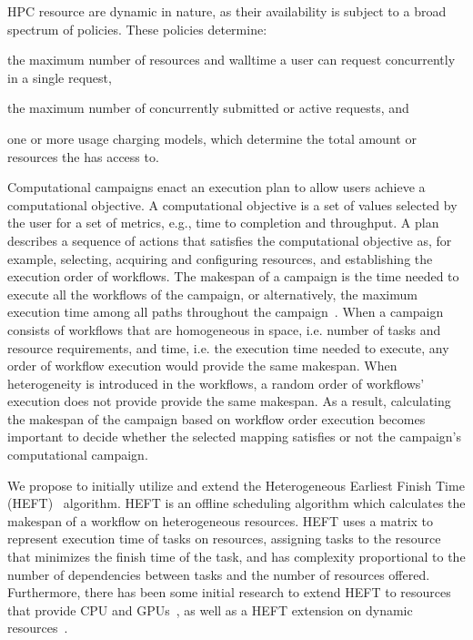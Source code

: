 HPC resource are dynamic in nature, as their availability is subject to a broad spectrum of policies.
These policies determine:
\begin{inparaenum}[1)]
\item the maximum number of resources and walltime a user can request concurrently in a single request,
\item the maximum number of concurrently submitted or active requests, and
\item one or more usage charging models, which determine the total amount or resources the has access to.
\end{inparaenum}

Computational campaigns enact an execution plan to allow users achieve a computational objective.
A computational objective is a set of values selected by the user for a set of metrics, e.g., time to completion and throughput.
A plan describes a sequence of actions that satisfies the computational objective as, for example, selecting, acquiring and configuring resources, and establishing the execution order of workflows.
The makespan of a campaign is the time needed to execute all the workflows of the campaign, or alternatively, the maximum execution time among all paths throughout the campaign~\cite{chirkin2017execution}.
When a campaign consists of workflows that are homogeneous in space, i.e. number of tasks and resource requirements, and time, i.e. the execution time needed to execute, any order of workflow execution would provide the same makespan.
When heterogeneity is introduced in the workflows, a random order of workflows' execution does not provide provide the same makespan.
As a result, calculating the makespan of the campaign based on workflow order execution becomes important to decide whether the selected mapping satisfies or not the campaign's computational campaign.

We propose to initially utilize and extend the Heterogeneous Earliest Finish Time (HEFT)~\cite{topcuoglu2002performance} algorithm.
HEFT is an offline scheduling algorithm which calculates the makespan of a workflow on heterogeneous resources.
HEFT uses a matrix to represent execution time of tasks on resources, assigning tasks to the resource that minimizes the finish time of the task, and has complexity proportional to the number of dependencies between tasks and the number of resources offered.
Furthermore, there has been some initial research to extend HEFT to resources that provide CPU and GPUs~\cite{shetti2013optimization}, as well as a HEFT extension on dynamic resources~\cite{dong2007pfas}.

